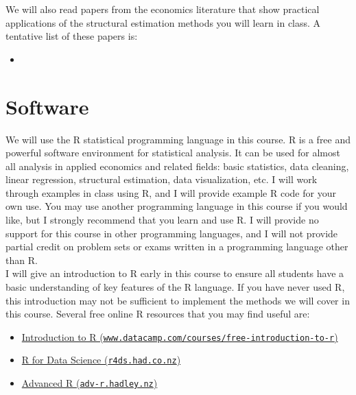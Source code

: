 \documentclass[11pt,letterpaper]{article}
\begin{document}
\noindent We will also read papers from the economics literature that show practical applications of the structural estimation methods you will learn in class. A tentative list of these papers is:
\begin{itemize}
	\item[] \begin{refsection} \nocite{adamowicz_combining_1994,bayer_migration_2009,berry_automobile_1995,crawford_welfare_2012,fowlie_emissions_2010,gruber_tax_1994,handel_adverse_2013,nevo_practitioners_2000,nevo_taking_2010,reiss_structural_2007,revelt_mixed_1998,rust_optimal_1987,schaefer_dependence_1998,train_demand_1987} \printbibliography[heading=none] \end{refsection}
\end{itemize}

\section*{Software}

We will use the R statistical programming language in this course. R is a free and powerful software environment for statistical analysis. It can be used for almost all analysis in applied economics and related fields: basic statistics, data cleaning, linear regression, structural estimation, data visualization, etc. I will work through examples in class using R, and I will provide example R code for your own use. You may use another programming language in this course if you would like, but I strongly recommend that you learn and use R. I will provide no support for this course in other programming languages, and I will not provide partial credit on problem sets or exams written in a programming language other than R. \\

\noindent I will give an introduction to R early in this course to ensure all students have a basic understanding of key features of the R language. If you have never used R, this introduction may not be sufficient to implement the methods we will cover in this course. Several free online R resources that you may find useful are:
\begin{itemize}
	\item[] \href{https://www.datacamp.com/courses/free-introduction-to-r}{Introduction to R (\texttt{www.datacamp.com/courses/free-introduction-to-r})}
	\item[] \href{https://r4ds.had.co.nz/}{R for Data Science (\texttt{r4ds.had.co.nz})}
	\item[] \href{https://adv-r.hadley.nz/}{Advanced R (\texttt{adv-r.hadley.nz})}
\end{itemize}
\end{document}
